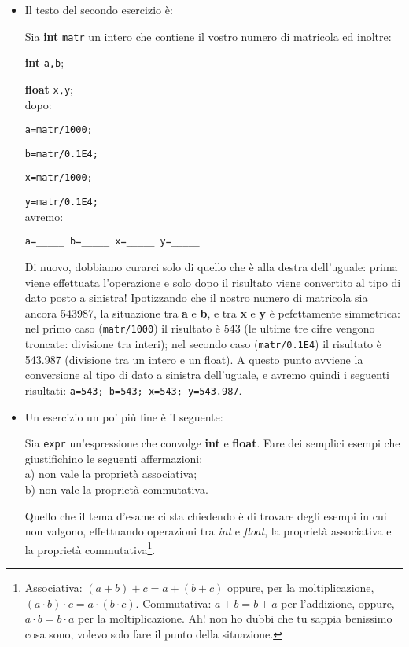 \begin{itemize}
\item Il testo del secondo esercizio è:
\begin{shaded}

Sia \textbf{int} \verb|matr| un intero che contiene il vostro numero di matricola ed inoltre:

\qquad\textbf{int} \verb|a,b|;

\qquad\textbf{float} \verb|x,y|;\\
dopo:

\qquad\verb|a=matr/1000;|
    
\qquad\verb|b=matr/0.1E4;|

\qquad\verb|x=matr/1000;|

\qquad\verb|y=matr/0.1E4;|\\
avremo:

\qquad\verb|a=_____ b=_____ x=_____ y=_____|
\end{shaded}

Di nuovo, dobbiamo curarci solo di quello che è alla destra dell'uguale: prima viene effettuata l'operazione e solo dopo il risultato viene convertito al tipo di dato posto a sinistra! Ipotizzando che il nostro numero di matricola sia ancora 543987, la situazione tra \textbf{a} e \textbf{b}, e tra \textbf{x} e \textbf{y} è pefettamente simmetrica: nel primo caso (\verb|matr/1000|) il risultato è 543 (le ultime tre cifre vengono troncate: divisione tra interi); nel secondo caso (\verb|matr/0.1E4|) il risultato è 543.987 (divisione tra un intero e un float). A questo punto avviene la conversione al tipo di dato a sinistra dell'uguale, e avremo quindi i seguenti risultati: \verb|a=543; b=543; x=543; y=543.987|.
\item Un esercizio un po' più fine è il seguente:
\begin{shaded}
Sia \verb|expr| un'espressione che convolge \textbf{int} e \textbf{float}. Fare dei semplici esempi che giustifichino le seguenti affermazioni:\\
a) non vale la proprietà associativa;\\
b) non vale la proprietà commutativa.
\end{shaded}

	Quello che il tema d'esame ci sta chiedendo è di trovare degli esempi in cui non valgono, effettuando operazioni tra \emph{int} e \emph{float}, la proprietà associativa  e la proprietà commutativa\footnote{Associativa: $(a+b)+c=a+(b+c)$ oppure, per la moltiplicazione, $(a\cdot b)\cdot c=a\cdot(b\cdot c)$. Commutativa: $a+b=b+a$ per l'addizione, oppure, $a\cdot b=b\cdot a$ per la moltiplicazione. Ah! non ho dubbi che tu sappia benissimo cosa sono, volevo solo fare il punto della situazione.}.
	

\end{itemize}
